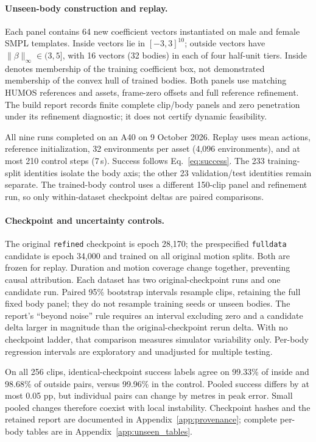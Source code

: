 \documentclass[11pt]{article}
\begin{document}
\paragraph{Unseen-body construction and replay.}
Each panel contains 64 new coefficient vectors instantiated on male and female
SMPL templates. Inside vectors lie in $[-3,3]^{10}$; outside vectors have
$\|\beta\|_\infty\in(3,5]$, with 16 vectors (32 bodies) in each of four
half-unit tiers. Inside denotes membership of the training coefficient box,
not demonstrated membership of the convex hull of trained bodies. Both
panels use matching HUMOS references and assets, frame-zero offsets and
full reference refinement. The build report records finite complete clip/body
panels and zero penetration under its refinement diagnostic; it does not
certify dynamic feasibility.

All nine runs completed on an A40 on 9 October 2026. Replay uses mean actions,
reference initialization, 32 environments per asset (4,096 environments),
and at most 210 control steps (7\,s). Success follows Eq.~\eqref{eq:success}.
The 233 training-split identities isolate the body axis; the other 23
validation/test identities remain separate. The trained-body control uses a
different 150-clip panel and refinement run, so only within-dataset checkpoint
deltas are paired comparisons.

\paragraph{Checkpoint and uncertainty controls.}
The original \texttt{refined} checkpoint is epoch 28,170; the prespecified
\texttt{fulldata} candidate is epoch 34,000 and trained on all original motion
splits. Both are frozen for replay. Duration and motion coverage change
together, preventing causal attribution. Each dataset has two original-checkpoint
runs and one candidate run. Paired 95\% bootstrap intervals resample clips,
retaining the full fixed body panel; they do not resample training seeds or
unseen bodies. The report's ``beyond noise'' rule requires an interval excluding
zero and a candidate delta larger in magnitude than the original-checkpoint
rerun delta. With no checkpoint ladder, that comparison measures simulator
variability only. Per-body regression intervals are exploratory and unadjusted
for multiple testing.

On all 256 clips, identical-checkpoint success labels agree on 99.33\% of
inside and 98.68\% of outside pairs, versus 99.96\% in the control. Pooled
success differs by at most 0.05 pp, but individual pairs can change by metres
in peak error. Small pooled changes therefore coexist with local instability.
Checkpoint hashes and the retained report are documented in
Appendix~\ref{app:provenance}; complete per-body tables are in
Appendix~\ref{app:unseen_tables}.
\end{document}
